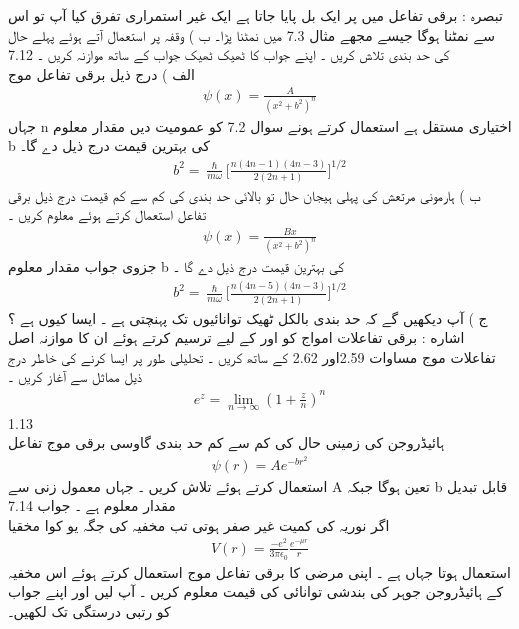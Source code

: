 تبصرہ : برقی تفاعل میں  پر ایک بل پایا جاتا ہے ایک غیر استمراری تفرق کیا آپ تو اس سے نمٹنا ہوگا جیسے مجھے مثال 7.3 میں نمٹنا پڑا۔
ب ) وقفہ  پر  استعمال آتے ہوئے پہلے حال کی حد بندی تلاش کریں ۔ اپنے جواب کا ٹھیک ٹھیک جواب کے ساتھ موازنہ کریں ۔
7.12\\
الف ) درج ذیل برقی تفاعل موج 
\begin{align}
\psi(x)=\frac{A}{(x^{2}+b^{2})^n} 
\end{align}
 جہاں n اختیاری مستقل ہے استعمال کرتے ہونے سوال 7.2 کو عمومیت دیں مقدار معلوم b کی بہترین قیمت درج ذیل دے گا۔
\begin{align}
b^{2}=\frac{\hslash}{m\omega}\big[\frac{n(4n-1)(4n-3)}{2(2n+1)}\big]^{1/2} 
\end{align}
 ب ) ہارمونی مرتعش کی پہلی ہیجان حال تو بالائی حد بندی کی کم سے کم قیمت درج ذیل برقی تفاعل استعمال کرتے ہوئے معلوم کریں ۔
\begin{align}
\psi(x)=\frac{Bx}{(x^{2}+b^{2})^n} 
\end{align}
 جزوی جواب مقدار معلوم b کی بہترین قیمت درج ذیل دے گا ۔
\begin{align}
b^{2}=\frac{\hslash}{m\omega}\big[\frac{n(4n-5)(4n-3)}{2(2n+1)}\big]^{1/2} 
\end{align}
 ج ) آپ دیکھیں گے کہ  حد بندی بالکل ٹھیک توانائیوں تک پہنچتی ہے ۔ ایسا کیوں ہے ؟
اشاره : برقی تفاعلات امواج کو  اور  کے لیے ترسیم کرتے ہوئے ان کا موازنہ اصل تفاعلات موج مساوات 2.59اور 2.62 کے ساتھ کریں ۔ تحلیلی طور پر ایسا کرنے کی خاطر درج ذیل مماثل سے آغاز کریں ۔
\begin{align}
e^{z}=\lim_{n \to \infty}(1+\frac{z}{n})^{n} 
\end{align}
1.13\\
ہائیڈروجن کی زمینی حال کی کم سے کم حد بندی گاوسی برقی موج تفاعل
\begin{align}
\psi(r)=Ae^{-br^{2}} 
\end{align}
 استعمال کرتے ہوئے تلاش کریں ۔ جہاں معمول زنی سے A تعین ہوگا جبکہ b قابل تبدیل مقدار معلوم ہے ۔ جواب 
7.14\\
اگر نوریہ کی کمیت غیر صفر  ہوتی تب مخفیہ کی جگہ یو کوا مخقیا
\begin{align}
V(r)=\frac{-e^{2}}{3\pi\epsilon_{0}}\frac{e^{-\mu r}}{r} 
\end{align}
 استعمال ہوتا جہاں  ہے ۔ اپنی مرضی کا برقی تفاعل موج استعمال کرتے ہوئے اس مخفیہ کے ہائیڈروجن  جوہر کی بندشی توانائی کی قیمت معلوم کریں ۔ آپ  لیں اور اپنے جواب کو  رتبی درستگی تک لکھیں۔
